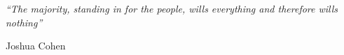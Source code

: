 \documentclass[11pt, oneside, dvipsnames]{Thesis} %
\begin{document}
\pagestyle{empty} %

\null\vfill %

\textit{``The majority, standing in for the people, wills everything and therefore wills nothing''}

\begin{flushright}
	Joshua Cohen
\end{flushright}

\vfill\vfill\vfill\vfill\vfill\vfill\null %

\clearpage %


\end{document}
